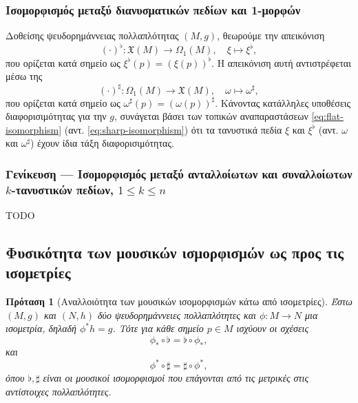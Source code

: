 \documentclass[11pt,a4paper,twoside,openright]{book}
\newtheorem{proposition}[lemma]{Πρόταση}
\begin{document}
\subsubsection{Ισομορφισμός μεταξύ διανυσματικών πεδίων και 1-μορφών}

Δοθείσης ψευδορημάννειας πολλαπλότητας $(Μ, g)$,
θεωρούμε την απεικόνιση
\begin{equation}\label{eq:flat-isomorphism-fields}
\left(\cdot\right)^\flat: \mathfrak{X}(M) \to \Omega_1(M),
\quad
\xi \mapsto \xi^\flat,
\end{equation}
που ορίζεται κατά σημείο ως
$\xi^\flat(p) = \left(\xi(p)\right)^\flat$.
Η απεικόνιση αυτή αντιστρέφεται μέσω της
\begin{equation}\label{eq:sharp-isomorphism-fields}
\left(\cdot\right)^\sharp: \Omega_1(M) \to \mathfrak{X}(M),
\quad
\omega \mapsto \omega^\sharp,
\end{equation}
που ορίζεται κατά σημείο ως
$\omega^\sharp(p) = \left(\omega(p)\right)^\sharp$.
Κάνοντας κατάλληλες υποθέσεις διαφορισιμότητας για την $g$,
συνάγεται βάσει των τοπικών αναπαραστάσεων
\eqref{eq:flat-isomorphism}
(αντ. \eqref{eq:sharp-isomorphism})
ότι τα τανυστικά πεδία $\xi$ και $\xi^\flat$
(αντ. $\omega$ και $\omega^\sharp$)
έχουν ίδια τάξη διαφορισιμότητας.

\subsubsection{Γενίκευση --- Ισομορφισμός μεταξύ ανταλλοίωτων και συναλλοίωτων $k$-τανυστικών πεδίων, $1 \le k \le n$}

TODO

\subsection{Φυσικότητα των μουσικών ισμορφισμών ως προς τις ισομετρίες}

\begin{proposition}[Αναλλοιότητα των μουσικών ισομορφισμών κάτω από ισομετρίες]
	\label{prop:musical-isomorphisms-invariance-under-isometries}
Έστω $(M, g)$ και $(N, h)$ δύο ψευδορημάννειες πολλαπλότητες και
$\phi: M \to N$ μια ισομετρία, δηλαδή $\phi^* h = g$.
Τότε για κάθε σημείο $p \in M$ ισχύουν οι σχέσεις
\begin{equation}\label{eq:flat-invariance-under-isometry}
\phi_* \circ \flat = \flat \circ \phi_*,
\end{equation}
και
\begin{equation}\label{eq:sharp-invariance-under-isometry}
\phi^* \circ \sharp = \sharp \circ \phi^*,
\end{equation}
όπου $\flat, \sharp$ είναι οι μουσικοί ισομορφισμοί που επάγονται από τις μετρικές στις αντίστοιχες πολλαπλότητες.
\end{proposition}
\end{document}
